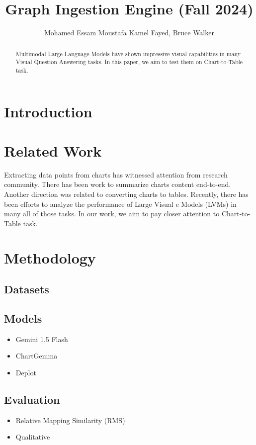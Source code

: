 \documentclass[
	letterpaper, %
]{jdf}
\author{Mohamed Essam Moustafa Kamel Fayed, Bruce Walker}
\title{Graph Ingestion Engine (Fall 2024)}
\begin{document}

\maketitle

\begin{abstract}
Multimodal     Large Language Models have shown impressive visual capabilities in many Visual Question Answering tasks.
In this paper, we aim to test them on Chart-to-Table task.
     \end{abstract}

     \tableofcontents

\section{Introduction}
\section{Related Work}
Extracting data points from charts has witnessed attention from research community.
There has been work to summarize charts content end-to-end.
Another direction was related to converting charts to tables.
Recently, there has been efforts to analyze the performance of Large Visual e Models (LVMs) in many all of those tasks.
In our work, we aim to pay closer attention to Chart-to-Table task.
\section{Methodology}\label{sect:methodology}
\subsection{Datasets}
\subsection{Models}
\begin{itemize}
         \item Gemini 1.5 Flash
         \item ChartGemma
         \item Deplot
              \end{itemize}
\subsection{Evaluation}
\begin{itemize}
    \item Relative Mapping Similarity (RMS)
    \item Qualitative
              \end{itemize}
\end{document}
